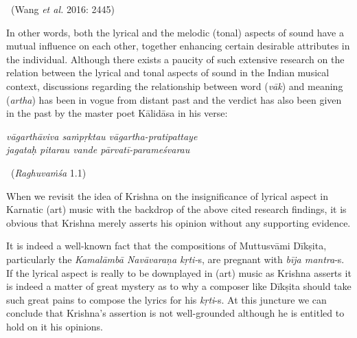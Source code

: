 \vspace{-.3cm}

\begin{myquote}

~\hfill (Wang \textit{et al.} 2016: 2445)
\end{myquote}

In other words, both the lyrical and the melodic (tonal) aspects of sound have a mutual influence on each other, together enhancing certain desirable attributes in the individual. Although there exists a paucity of such extensive research on the relation between the lyrical and tonal aspects of sound in the Indian musical context, discussions regarding the relationship between word (\textit{vāk}) and meaning (\textit{artha}) has been in vogue from distant past and the verdict has also been given in the past by the master poet Kālidāsa in his verse:

\vspace{.1cm}

\begin{centerquote}
\textit{vāgarthāviva saṁpṛktau vāgartha-pratipattaye  }\\ \textit{jagataḥ pitarau vande pārvatī-parameśvarau } 

~\hfill (\textit{Raghuvaṁśa} 1.1)
\end{centerquote}

\vspace{.1cm}

When we revisit the idea of Krishna on the insignificance of lyrical aspect in Karnatic (art) music with the backdrop of the above cited research findings, it is obvious that Krishna merely asserts his opinion without any supporting evidence.

It is indeed a well-known fact that the compositions of Muttusvāmi Dīkṣita, particularly the \textit{Kamalāmbā Navāvaraṇa kṛti-}s, are pregnant with \textit{bīja mantra}-s. If the lyrical aspect is really to be downplayed in (art) music as Krishna asserts it is indeed a matter of great mystery as to why a composer like Dīkṣita should take such great pains to compose the lyrics for his \textit{kṛti}-s. At this juncture we can conclude that Krishna’s assertion is not well-grounded although he is entitled to hold on it his opinions.

